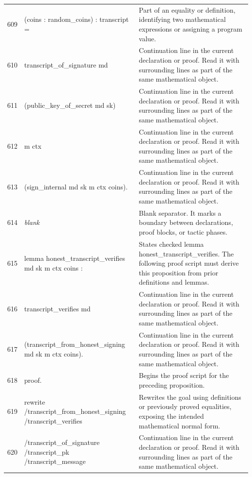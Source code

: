 \documentclass[10pt]{article}
\begin{document}
\begin{longtable}{r L{0.53\textwidth} L{0.37\textwidth}}
609 & {\ttfamily\scriptsize    (coins : random\_coins) : transcript =} & Part of an equality or definition, identifying two mathematical expressions or assigning a program value. \\
610 & {\ttfamily\scriptsize   transcript\_of\_signature md} & Continuation line in the current declaration or proof.  Read it with surrounding lines as part of the same mathematical object. \\
611 & {\ttfamily\scriptsize     (public\_key\_of\_secret md sk)} & Continuation line in the current declaration or proof.  Read it with surrounding lines as part of the same mathematical object. \\
612 & {\ttfamily\scriptsize     m ctx} & Continuation line in the current declaration or proof.  Read it with surrounding lines as part of the same mathematical object. \\
613 & {\ttfamily\scriptsize     (sign\_internal md sk m ctx coins).} & Continuation line in the current declaration or proof.  Read it with surrounding lines as part of the same mathematical object. \\
614 & {\ttfamily\scriptsize \emph{blank}} & Blank separator.  It marks a boundary between declarations, proof blocks, or tactic phases. \\
615 & {\ttfamily\scriptsize lemma honest\_transcript\_verifies md sk m ctx coins :} & States checked lemma honest\_transcript\_verifies.  The following proof script must derive this proposition from prior definitions and lemmas. \\
616 & {\ttfamily\scriptsize   transcript\_verifies md} & Continuation line in the current declaration or proof.  Read it with surrounding lines as part of the same mathematical object. \\
617 & {\ttfamily\scriptsize     (transcript\_from\_honest\_signing md sk m ctx coins).} & Continuation line in the current declaration or proof.  Read it with surrounding lines as part of the same mathematical object. \\
618 & {\ttfamily\scriptsize proof.} & Begins the proof script for the preceding proposition. \\
619 & {\ttfamily\scriptsize rewrite /transcript\_from\_honest\_signing /transcript\_verifies} & Rewrites the goal using definitions or previously proved equalities, exposing the intended mathematical normal form. \\
620 & {\ttfamily\scriptsize         /transcript\_of\_signature /transcript\_pk /transcript\_message} & Continuation line in the current declaration or proof.  Read it with surrounding lines as part of the same mathematical object. \\

\end{longtable}
\end{document}

